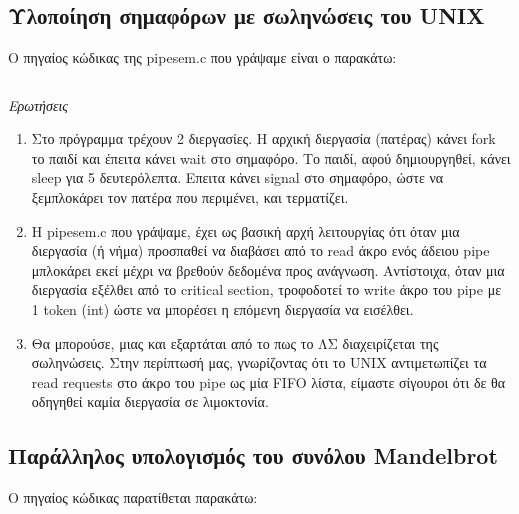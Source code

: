 \documentclass[a4paper,10pt]{article} \usepackage{anysize}
\begin{document}


\section*{} \setcounter{section}{1}
\subsection{Υλοποίηση σημαφόρων με σωληνώσεις του UNIX} 
Ο πηγαίος κώδικας της pipesem.c που γράψαμε είναι ο παρακάτω:
\inputminted[linenos,fontsize=\footnotesize,frame=leftline]{c}{files/pipesem.c}

\newpage
\emph{Ερωτήσεις}
\begin{enumerate}
\item Στο πρόγραμμα τρέχουν 2 διεργασίες. Η αρχική διεργασία (πατέρας) κάνει fork το παιδί και έπειτα κάνει wait στο σημαφόρο.
Το παιδί, αφού δημιουργηθεί, κάνει sleep για 5 δευτερόλεπτα. Επειτα κάνει signal στο σημαφόρο, ώστε να ξεμπλοκάρει τον πατέρα που περιμένει, και τερματίζει.
\item H pipesem.c που γράψαμε, έχει ως βασική αρχή λειτουργίας ότι όταν μια διεργασία (ή νήμα) προσπαθεί να διαβάσει από το read άκρο ενός άδειου pipe
μπλοκάρει εκεί μέχρι να βρεθούν δεδομένα προς ανάγνωση. Αντίστοιχα, όταν μια διεργασία εξέλθει από το critical section, τροφοδοτεί το write άκρο του
pipe με 1 token (int) ώστε να μπορέσει η επόμενη διεργασία να εισέλθει.
\item Θα μπορούσε, μιας και εξαρτάται από το πως το ΛΣ διαχειρίζεται της σωληνώσεις. Στην περίπτωσή μας, γνωρίζοντας ότι το UNIX αντιμετωπίζει τα
read requests στο άκρο του pipe ως μία FIFO λίστα, είμαστε σίγουροι ότι δε θα οδηγηθεί καμία διεργασία σε λιμοκτονία.\\
\end{enumerate}


\subsection{Παράλληλος υπολογισμός του συνόλου Mandelbrot} 
Ο πηγαίος κώδικας παρατίθεται παρακάτω:
\inputminted[linenos,fontsize=\footnotesize,frame=leftline]{c}{files/mandel.c}

\end{document}

